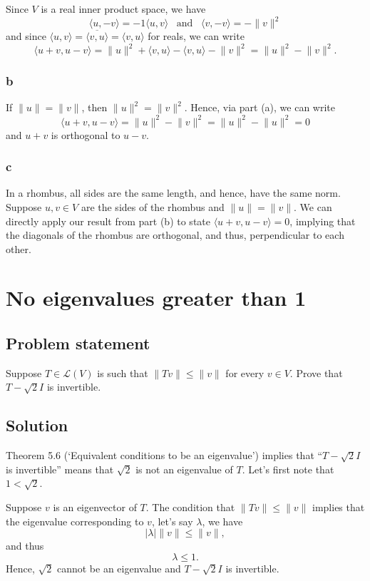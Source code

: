 \documentclass{article}
\providecommand{\abs}[1]{\lvert#1\rvert} \providecommand{\norm}[1]{\lVert#1\rVert}
\begin{document}
Since $V$ is a real inner product space, we have
\[\langle u,-v\rangle=-1\langle u,v\rangle \;\;\;\text{and}\;\;\; \langle v,-v\rangle=-\norm{v}^2\]
and since $\langle u,v\rangle=\overline{\langle v,u\rangle}=\langle v,u \rangle$ for reals, we can write
\[\langle u+v,u-v\rangle=\norm{u}^2+\langle v,u\rangle -\langle v,u \rangle - \norm{v}^2=\norm{u}^2 - \norm{v}^2.\]

\subsubsection*{b}
If $\norm{u} = \norm{v}$, then $\norm{u}^2 = \norm{v}^2$. 
Hence, via part (a), we can write
\[\langle u+v,u-v\rangle=\norm{u}^2 - \norm{v}^2=\norm{u}^2 -\norm{u}^2=0\]
and $u+v$ is orthogonal to $u-v$.

\subsubsection*{c}
In a rhombus, all sides are the same length, and hence, have the same norm. 
Suppose $u,v\in V$ are the sides of the rhombus and $\norm{u} = \norm{v}$. 
We can directly apply our result from part (b) to state $\langle u+v,u-v\rangle=0$, implying that the diagonals of the rhombus are orthogonal, and thus, perpendicular to each other.

\clearpage

\section{No eigenvalues greater than 1}
\subsection*{Problem statement}
Suppose $T\in \mathcal{L}(V)$ is such that $\norm{Tv}\leq\norm{v}$ for every $v\in V$. 
Prove that $T-\sqrt{2}I$ is invertible.

\subsection*{Solution}
Theorem 5.6 (`Equivalent conditions to be an eigenvalue') implies that ``$T-\sqrt{2}I$ is invertible'' means that $\sqrt{2}$ is not an eigenvalue of $T$. 
Let's first note that $1<\sqrt{2}$. 

Suppose $v$ is an eigenvector of $T$. 
The condition that $\norm{Tv}\leq\norm{v}$ implies that the eigenvalue corresponding to $v$, let's say $\lambda$, we have
\[\abs{\lambda}\norm{v}\leq\norm{v},\]
and thus
\[\lambda\leq 1.\]
Hence, $\sqrt{2}$ cannot be an eigenvalue and $T-\sqrt{2}I$ is invertible.
\end{document}
